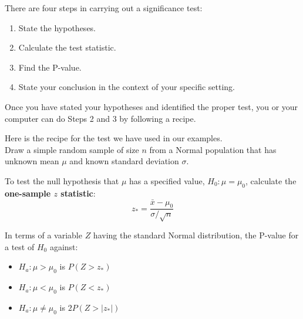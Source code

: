 \begin{tcolorbox}[title=\textbf{Tests for a Population Mean},
  colback=yellow!10,
  colframe=black!45,
  coltitle=black,
  fonttitle=\bfseries,
  breakable]

There are four steps in carrying out a significance test:
\begin{enumerate}
  \item State the hypotheses.
  \item Calculate the test statistic.
  \item Find the P-value.
  \item State your conclusion in the context of your specific setting.
\end{enumerate}

Once you have stated your hypotheses and identified the proper test, you or your computer can do Steps 2 and 3 by following a recipe. 

\end{tcolorbox}
\begin{tcolorbox}[title=\textbf{Z Test for a Population Mean $\mu$},
  colback=yellow!10,
  colframe=black!45,
  coltitle=black,
  fonttitle=\bfseries,
  breakable]

Here is the recipe for the test we have used in our examples.\\
Draw a simple random sample of size $n$ from a Normal population that has unknown mean $\mu$ and known standard deviation $\sigma$.

To test the null hypothesis that $\mu$ has a specified value, $H_0 : \mu = \mu_0$, calculate the \textbf{one-sample $z$ statistic}:
\[
z_\ast = \frac{\bar{x} - \mu_0}{\sigma / \sqrt{n}}
\]

In terms of a variable $Z$ having the standard Normal distribution, the P-value for a test of $H_0$ against:
\begin{itemize}
  \item $H_a: \mu > \mu_0$ is $P(Z > z_\ast)$
  \item $H_a: \mu < \mu_0$ is $P(Z < z_\ast)$
  \item $H_a: \mu \ne \mu_0$ is $2P(Z > |z_\ast|)$
\end{itemize}

\end{tcolorbox}
